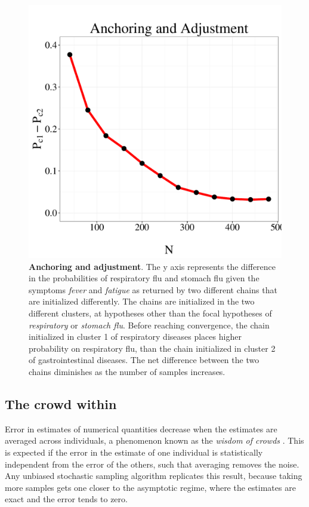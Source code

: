 \begin{figure}
\centering
\includegraphics[scale = 0.5]{figures/anchoring.pdf}
\caption{\textbf{Anchoring and adjustment}. The y axis represents the difference in the probabilities of respiratory flu and stomach flu given the symptoms \textit{fever} and \textit{fatigue} as returned by two different chains that are initialized differently. The chains are initialized in the two different clusters, at hypotheses other than the focal hypotheses of \textit{respiratory} or \textit{stomach flu}. Before reaching convergence, the chain initialized in cluster 1 of respiratory diseases places higher probability on respiratory flu, than the chain initialized in cluster 2 of gastrointestinal diseases. The net difference between the two chains diminishes as the number of samples increases.}
\label{fig:anch}
\end{figure}

\subsection{The crowd within}

Error in estimates of numerical quantities decrease when the estimates are averaged across individuals, a phenomenon known as the \emph{wisdom of crowds} \citep{surowiecki2005wisdom}. This is expected if the error in the estimate of one individual is statistically independent from the error of the others, such that averaging removes the noise. Any unbiased stochastic sampling algorithm replicates this result, because taking more samples gets one closer to the asymptotic regime, where the estimates are exact and the error tends to zero.

